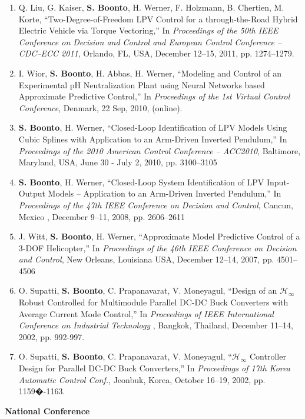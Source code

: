 \documentclass[10pt]{article}
\begin{document}
\begin{enumerate}
    \item Q. Liu, G. Kaiser, \textbf{S. Boonto}, H. Werner, F. Holzmann, B. Chertien, M. Korte, ``Two-Degree-of-Freedom LPV Control for a through-the-Road Hybrid Electric Vehicle via Torque	Vectoring,'' In \emph{Proceedings of the 50th IEEE Conference on Decision and Control and European Control Conference -- CDC--ECC 2011}, Orlando, FL, USA, December 12--15, 2011, pp. 1274--1279.
	\item I. Wior, \textbf{S. Boonto}, H. Abbas, H. Werner, ``Modeling and Control of an Experimental pH Neutralization Plant using Neural Networks based Approximate Predictive Control,'' In \emph{Proceedings of  the 1st Virtual Control Conference}, Denmark, 22 Sep, 2010, (online).
    \item \textbf{S. Boonto}, H. Werner, ``Closed-Loop Identification of LPV Models Using Cubic Splines with Application to an Arm-Driven Inverted Pendulum,'' In \emph{Proceedings of the 2010 American Control Conference -- ACC2010}, Baltimore, Maryland, USA, June 30 - July 2, 2010, pp. 3100--3105
    \item \textbf{S. Boonto}, H. Werner, ``Closed-Loop System Identification of LPV Input-Output Models -- Application to an Arm-Driven Inverted Pendulum,'' In \emph{Proceedings of the 47th IEEE Conference on Decision and Control}, Cancun, Mexico , December 9--11, 2008, pp. 2606--2611
    \item J. Witt, \textbf{S. Boonto}, H. Werner, ``Approximate Model Predictive Control of a 3-DOF Helicopter,'' In \emph{Proceedings of the 46th IEEE Conference on Decision and Control}, New Orleans, Louisiana USA, December 12--14, 2007,  pp. 4501--4506
    \item O. Supatti, \textbf{S. Boonto}, C. Prapanavarat, V. Moneyagul,
        ``Design of an $\mathcal{H}_\infty$ Robust Controlled for Multimodule
        Parallel DC-DC Buck Converters with Average Current Mode Control,''
        In \emph{Proceedings of IEEE International Conference on Industrial Technology}
        , Bangkok, Thailand,  December 11--14, 2002, pp. 992-997.

    \item O. Supatti, \textbf{S. Boonto}, C. Prapanavarat, V. Moneyagul,
        ``$\mathcal{H}_\infty$ Controller
        Design for Parallel DC-DC Buck Converters,'' In \emph{Proceedings of 17th Korea
        Automatic Control Conf.}, Jeonbuk, Korea, October 16--19, 2002, pp. 1159�-1163.
\end{enumerate}
\textbf{National Conference}
\end{document}
